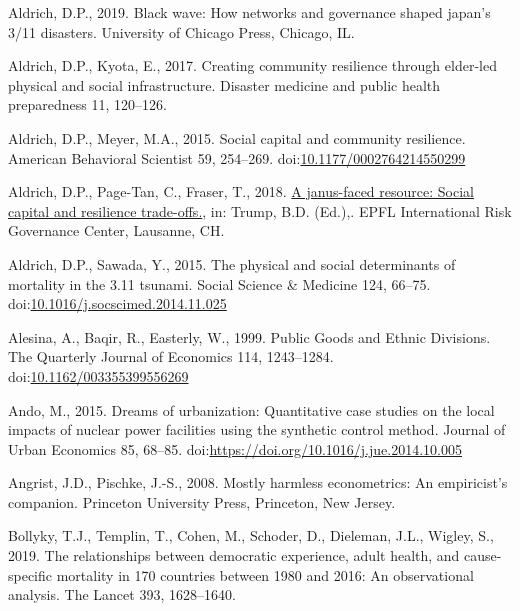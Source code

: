 \documentclass[]{elsarticle} %
\newlength{\cslhangindent}
\newlength{\cslentryspacingunit} %
\newenvironment{CSLReferences}[2] %
 {%
  \setlength{\parindent}{0pt}
  \ifodd #1
  \let\oldpar\par
  \def\par{\hangindent=\cslhangindent\oldpar}
  \fi
  \setlength{\parskip}{#2\cslentryspacingunit}
 }%
 {}
\begin{document}
\begin{CSLReferences}{1}{0}
\leavevmode{}%
Aldrich, D.P., 2019. Black wave: How networks and governance shaped
japan's 3/11 disasters. University of Chicago Press, Chicago, IL.

\leavevmode{}%
Aldrich, D.P., Kyota, E., 2017. Creating community resilience through
elder-led physical and social infrastructure. Disaster medicine and
public health preparedness 11, 120--126.

\leavevmode{}%
Aldrich, D.P., Meyer, M.A., 2015. Social capital and community
resilience. American Behavioral Scientist 59, 254--269.
doi:\href{https://doi.org/10.1177/0002764214550299}{10.1177/0002764214550299}

\leavevmode{}%
Aldrich, D.P., Page-Tan, C., Fraser, T., 2018.
\href{https://beta.irgc.org/wp-content/uploads/2018/12/Aldrich-et-al-for-IRGC-Resilience-Guide-Vol-2-2018.pdf}{A
janus-faced resource: Social capital and resilience trade-offs.}, in:
Trump, B.D. (Ed.),. EPFL International Risk Governance Center, Lausanne,
CH.

\leavevmode{}%
Aldrich, D.P., Sawada, Y., 2015. The physical and social determinants of
mortality in the 3.11 tsunami. Social Science \& Medicine 124, 66--75.
doi:\href{https://doi.org/10.1016/j.socscimed.2014.11.025}{10.1016/j.socscimed.2014.11.025}

\leavevmode{}%
Alesina, A., Baqir, R., Easterly, W., 1999. {Public Goods and Ethnic
Divisions}. The Quarterly Journal of Economics 114, 1243--1284.
doi:\href{https://doi.org/10.1162/003355399556269}{10.1162/003355399556269}

\leavevmode{}%
Ando, M., 2015. Dreams of urbanization: Quantitative case studies on the
local impacts of nuclear power facilities using the synthetic control
method. Journal of Urban Economics 85, 68--85.
doi:\url{https://doi.org/10.1016/j.jue.2014.10.005}

\leavevmode{}%
Angrist, J.D., Pischke, J.-S., 2008. Mostly harmless econometrics: An
empiricist's companion. Princeton University Press, Princeton, New
Jersey.

\leavevmode{}%
Bollyky, T.J., Templin, T., Cohen, M., Schoder, D., Dieleman, J.L.,
Wigley, S., 2019. The relationships between democratic experience, adult
health, and cause-specific mortality in 170 countries between 1980 and
2016: An observational analysis. The Lancet 393, 1628--1640.


\end{CSLReferences}
\end{document}

